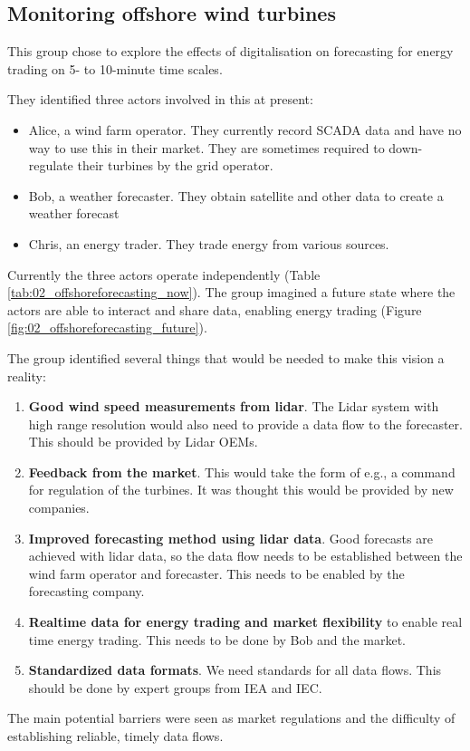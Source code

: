 \subsection{Monitoring offshore wind turbines}

This group chose to explore the effects of digitalisation on forecasting for energy trading on 5- to 10-minute time scales.

They identified three actors involved in this at present:

\begin{itemize}
\item
  Alice, a wind farm operator. They currently record SCADA data and have no way to use this in their market. They are sometimes required to down-regulate their turbines by the grid operator.
\item
  Bob, a weather forecaster. They obtain satellite and other data to create a weather forecast
\item
  Chris, an energy trader. They trade energy from various sources.
\end{itemize}

Currently the three actors operate independently (Table \ref{tab:02_offshoreforecasting_now}). The group imagined a future state where the actors are able to interact and share data, enabling energy trading (Figure \ref{fig:02_offshoreforecasting_future}).

The group identified several things that would be needed to make this vision a reality:

\begin{enumerate}
\item
  \textbf{Good wind speed measurements from lidar}. The Lidar system
  with high range resolution would also need to provide a data flow to
  the forecaster. This should be provided by Lidar OEMs.
\item
  \textbf{Feedback from the market}. This would take the form of e.g., a
  command for regulation of the turbines. It was thought this would be
  provided by new companies.
\item
  \textbf{Improved forecasting method using lidar data}. Good forecasts
  are achieved with lidar data, so the data flow needs to be established
  between the wind farm operator and forecaster. This needs to be
  enabled by the forecasting company.
\item
  \textbf{Realtime data for energy trading and market flexibility} to enable real time energy trading. This needs to be done by Bob and the market.
\item
  \textbf{Standardized data formats}. We need standards for all data flows. This should be done by expert groups from IEA and IEC.
\end{enumerate}

The main potential barriers were seen as market regulations and the difficulty of establishing reliable, timely data flows.

